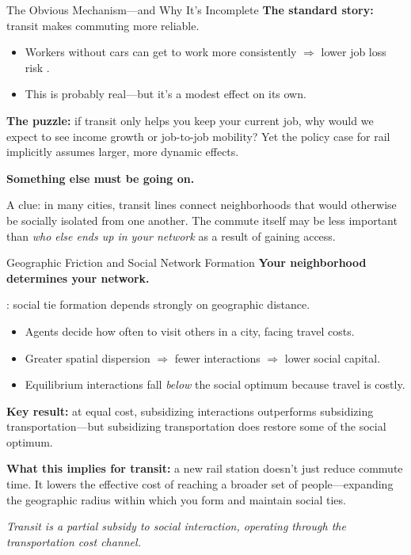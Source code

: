 \documentclass{beamer}
\begin{document}
\begin{frame}{The Obvious Mechanism---and Why It's Incomplete}
\small
\textbf{The standard story:} transit makes commuting more reliable.
\begin{itemize}
    \item Workers without cars can get to work more consistently $\Rightarrow$ lower job loss risk
          \parencite{sanchez_connection_1999, bastiaanssen_transport_employmentfx}.
    \item This is probably real---but it's a modest effect on its own.
\end{itemize}

\medskip
\textbf{The puzzle:} if transit only helps you keep your current job, why would we expect
to see income growth or job-to-job mobility? Yet the policy case for rail implicitly assumes
larger, more dynamic effects.

\medskip
\textbf{Something else must be going on.}

\medskip
A clue: in many cities, transit lines connect neighborhoods that would otherwise be
socially isolated from one another. The commute itself may be less important than
\emph{who else ends up in your network} as a result of gaining access.
\end{frame}

\begin{frame}{Geographic Friction and Social Network Formation}
\small
\textbf{Your neighborhood determines your network.}

\medskip
\textcite{kim_spatial_2023}: social tie formation depends strongly on geographic distance.
\begin{itemize}
    \item Agents decide how often to visit others in a city, facing travel costs.
    \item Greater spatial dispersion $\Rightarrow$ fewer interactions $\Rightarrow$ lower social capital.
    \item Equilibrium interactions fall \emph{below} the social optimum because travel is costly.
\end{itemize}

\medskip
\textbf{Key result:} at equal cost, subsidizing interactions outperforms subsidizing
transportation---but subsidizing transportation does restore some of the social optimum.

\medskip
\textbf{What this implies for transit:} a new rail station doesn't just reduce commute time.
It lowers the effective cost of reaching a broader set of people---expanding the geographic
radius within which you form and maintain social ties.

\medskip
\textit{Transit is a partial subsidy to social interaction, operating through the
transportation cost channel.}
\end{frame}
\end{document}
